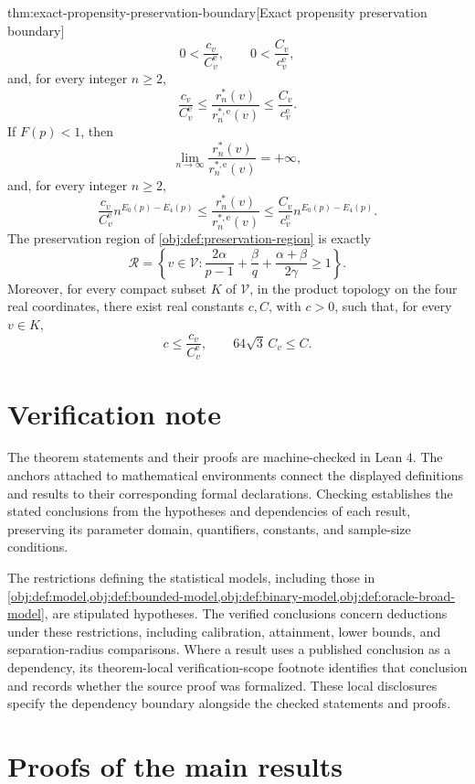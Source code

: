 \documentclass[11pt]{article}
\begin{document}
\begin{theoremv}{thm:exact-propensity-preservation-boundary}[Exact propensity preservation boundary]
\[
0<\frac{c_v}{C^{\mathrm e}_v},
\qquad
0<\frac{C_v}{c^{\mathrm e}_v},
\]
and, for every integer \(n\ge2\),
\[
\frac{c_v}{C^{\mathrm e}_v}
\le
\frac{r_n^*(v)}{r_n^{*,\mathrm e}(v)}
\le
\frac{C_v}{c^{\mathrm e}_v}.
\]
If \(F(p)<1\), then
\[
\lim_{n\to\infty}\frac{r_n^*(v)}{r_n^{*,\mathrm e}(v)}=+\infty,
\]
and, for every integer \(n\ge2\),
\[
\frac{c_v}{C^{\mathrm e}_v}n^{E_0(p)-E_4(p)}
\le
\frac{r_n^*(v)}{r_n^{*,\mathrm e}(v)}
\le
\frac{C_v}{c^{\mathrm e}_v}n^{E_0(p)-E_4(p)}.
\]
The preservation region of \cref{obj:def:preservation-region} is exactly
\[
\mathcal R=
\left\{v\in\mathcal V:
\frac{2\alpha}{p-1}+\frac{\beta}{q}
+\frac{\alpha+\beta}{2\gamma}\ge1\right\}.
\]
Moreover, for every compact subset \(K\) of \(\mathcal V\), in the product topology on the four real coordinates, there exist real constants \(c,C\), with \(c>0\), such that, for every \(v\in K\),
\[
c\le\frac{c_v}{C^{\mathrm e}_v},
\qquad
64\sqrt3\,C_v\le C.
\]
\end{theoremv}


\section{Verification note}

The theorem statements and their proofs are machine-checked in Lean 4. The anchors attached to mathematical environments connect the displayed definitions and results to their corresponding formal declarations. Checking establishes the stated conclusions from the hypotheses and dependencies of each result, preserving its parameter domain, quantifiers, constants, and sample-size conditions.

The restrictions defining the statistical models, including those in \cref{obj:def:model,obj:def:bounded-model,obj:def:binary-model,obj:def:oracle-broad-model}, are stipulated hypotheses. The verified conclusions concern deductions under these restrictions, including calibration, attainment, lower bounds, and separation-radius comparisons. Where a result uses a published conclusion as a dependency, its theorem-local verification-scope footnote identifies that conclusion and records whether the source proof was formalized. These local disclosures specify the dependency boundary alongside the checked statements and proofs.


\section{Proofs of the main results}\label{sec:deferred-proofs}
\end{document}
